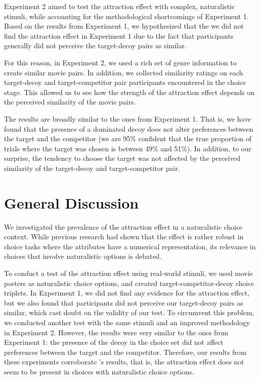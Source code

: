 \documentclass[11pt,a4paper]{article}
\begin{document}
Experiment 2 aimed to test the attraction effect with complex, naturalistic stimuli, while accounting for the methodological shortcomings of Experiment 1. Based on the results from Experiment 1, we hypothesized that the we did not find the attraction effect in Experiment 1 due to the fact that participants generally did not perceive the target-decoy pairs as similar.

For this reason, in Experiment 2, we used a rich set of genre information to create similar movie pairs. In addition, we collected similarity ratings on each target-decoy and target-competitor pair participants encountered in the choice stage. This allowed us to see how the strength of the attraction effect depends on the perceived similarity of the movie pairs.

The results are broadly similar to the ones from Experiment 1. That is, we have found that the presence of a dominated decoy does not alter preferences between the target and the competitor (we are 95\% confident that the true proportion of trials where the target was chosen is between 49\% and 51\%). In addition, to our surprise, the tendency to choose the target was not affected by the perceived similarity of the target-decoy and target-competitor pair.

\newpage

\section{General Discussion} 

We investigated the prevalence of the attraction effect in a naturalistic choice context. While previous research had shown that the effect is rather robust in choice tasks where the attributes have a numerical representation, its relevance in choices that involve naturalistic options is debated.

To conduct a test of the attraction effect using real-world stimuli, we used movie posters as naturalistic choice options, and created target-competitor-decoy choice triplets. In Experiment 1, we did not find any evidence for the attraction effect, but we also found that participants did not perceive our target-decoy pairs as similar, which cast doubt on the validity of our test. To circumvent this problem, we conducted another test with the same stimuli and an improved methodology in Experiment 2. However, the results were very similar to the ones from Experiment 1: the presence of the decoy in the choice set did not affect preferences between the target and the competitor. Therefore, our results from these experiments corroborate \citeauthor{Frederick2014}'s results, that is, the attraction effect does not seem to be present in choices with naturalistic choice options.
\end{document}
